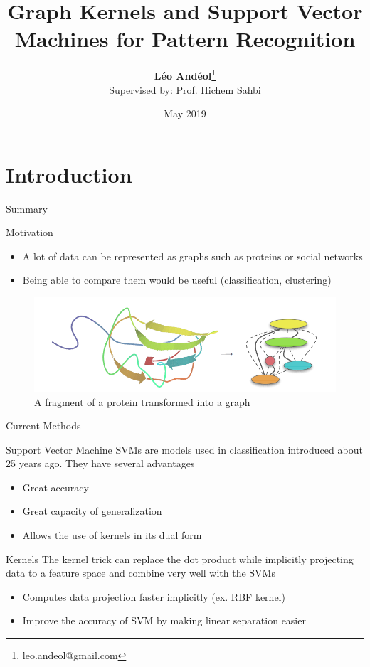 \documentclass[compress]{beamer}
\title[Graph Kernels]{Graph Kernels and Support Vector Machines for Pattern Recognition}
\author[Léo Andéol]{\textbf{Léo Andéol}\thanks{leo.andeol@gmail.com}\\ \footnotesize Supervised by: Prof. Hichem Sahbi}
\institute[Sorbonne Uni.]{Master DAC - Sorbonne Université}
\date{May 2019}
\begin{document}
\begin{frame}
  \titlepage
\end{frame}

\section{Introduction}
\begin{frame}{Summary}
  \tableofcontents[currentsection]
\end{frame}
\begin{frame}{Motivation}

\begin{itemize}
	\item A lot of data can be represented as graphs such as proteins or social networks
	\item Being able to compare them would be useful (classification, clustering)
\end{itemize}

\begin{figure}
	\includegraphics[width=\linewidth]{data/ecoli.png}
\caption{A fragment of a protein transformed into a graph\cite{vishwanathan_graph_2010}}
\end{figure}

\end{frame}

\begin{frame}{Current Methods}
\begin{block}{Support Vector Machine}
SVMs are models used in classification introduced about 25 years ago. They have several advantages
\begin{itemize}
	\item Great accuracy
	\item Great capacity of generalization
	\item Allows the use of kernels in its dual form
\end{itemize}
\end{block}

\begin{block}{Kernels}
	The kernel trick can replace the dot product while implicitly projecting data to a feature space and combine very well with the SVMs
\begin{itemize}
	\item Computes data projection faster implicitly (ex. RBF kernel)
	\item Improve the accuracy of SVM by making linear separation easier
\end{itemize}
\end{block}
\end{frame}
\end{document}
